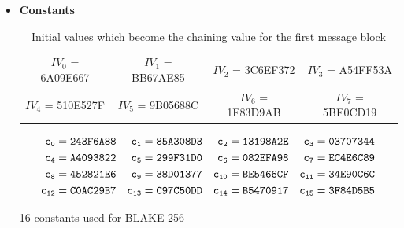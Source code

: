   \begin{itemize}
    \item {\bf Constants}
      \begin{table}[h]
        \begin{center}
          \begin{tabular}{ *{4}{c}}
            $IV_{0}$ = 6A09E667 & $IV_{1}$ = BB67AE85 & $IV_{2}$ = 3C6EF372 & $IV_{3}$ = A54FF53A \\
            $IV_{4}$ = 510E527F & $IV_{5}$ = 9B05688C & $IV_{6}$ = 1F83D9AB & $IV_{7}$ = 5BE0CD19 \\
          \end{tabular}
          \caption{Initial values which become the chaining value for the first message block\cite{00002}}
        \end{center}
      \end{table}
      
      \begin{table}[h]
        \begin{align*}
             {\tt c_{0}}  &= {\tt 243F6A88} & {\tt c_{1}}  &= {\tt 85A308D3} & {\tt c_{2}}  &= {\tt 13198A2E} & {\tt c_{3}}  &= {\tt 03707344}
          \\ {\tt c_{4}}  &= {\tt A4093822} & {\tt c_{5}}  &= {\tt 299F31D0} & {\tt c_{6}}  &= {\tt 082EFA98} & {\tt c_{7}}  &= {\tt EC4E6C89} 
          \\ {\tt c_{8}}  &= {\tt 452821E6} & {\tt c_{9}}  &= {\tt 38D01377} & {\tt c_{10}} &= {\tt BE5466CF} & {\tt c_{11}} &= {\tt 34E90C6C} 
          \\ {\tt c_{12}} &= {\tt C0AC29B7} & {\tt c_{13}} &= {\tt C97C50DD} & {\tt c_{14}} &= {\tt B5470917} & {\tt c_{15}} &= {\tt 3F84D5B5} 
        \end{align*}
        \caption{16 constants used for BLAKE-256\cite{00002}}
      \end{table}


\end{itemize}
